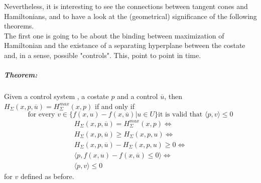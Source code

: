 Nevertheless, it is interesting to see the connections between tangent cones and Hamiltonians, and to have a look at the (geometrical) significance of the following theorems.\\
The first one is going to be about the binding between maximization of Hamiltonian and the existance of a separating hyperplane between the costate and, in a sense, possible "controls". This, point to point in time. 

\subparagraph[5.12]{Theorem:}Given a control system \controlSystem, a costate $p$ and a control $\overline{u}$, then\\
$H_\Sigma(x,p,\overline{u})=H_{\Sigma}^{max}(x,p)$ if and only if 
\[ \text{for every }v\in\{f(x,u)-f(x,\overline{u})|u\in U \}\text{it is valid that }\langle p,v \rangle\le0 \]
\begin{gather*}
	H_\Sigma(x,p,\overline{u})=H_{\Sigma}^{max}(x,p) \iff\\
	H_\Sigma(x,p,\overline{u})\ge H_\Sigma(x,p,u) \iff \\
	H_\Sigma(x,p,\overline{u})- H_\Sigma(x,p,u) \ge0 \iff\\
	\langle p,f(x,u)-f(x,\overline{u}) \le 0\rangle \iff\\
	\langle p,v \rangle \leq 0
\end{gather*}
for $v$ defined as before. \\



